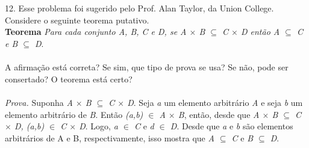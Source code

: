 \\
\\ 
12. Esse problema foi sugerido pelo Prof. Alan Taylor, da Union College. Considere o seguinte teorema putativo.
\\
\textbf{Teorema} \textit{Para cada conjunto A, B, C e D, se A $\times$ B $\subseteq$  C $\times$ D então A $\subseteq$  C e B $\subseteq$  D}.
\\
\\
A afirmação está correta? Se sim, que tipo de prova se usa? Se não, pode ser consertado? O teorema está certo?
\\
\\
\textit{Prova.} Suponha \textit{A $\times$ B $\subseteq$ C $\times$ D}. Seja \textit{a} um elemento arbitrário \textit{A} e seja \textit{b} um elemento arbitrário de \textit{B}. Então \textit{(a,b) $\in$  A $\times$ B}, então, desde que  \textit{A $\times$ B $\subseteq$  C $\times$ D, (a,b) $\in$ C $\times$ D}. Logo, \textit{a $\in$ C} e \textit{d $\in$ D}. Desde que \textit{a} e \textit{b} são elementos arbitrários de A e B, respectivamente, isso mostra que \textit{A $\subseteq$ C}  e \textit{B $\subseteq$ D}.


